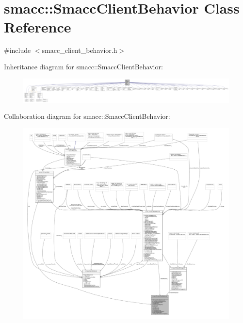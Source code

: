 \hypertarget{classsmacc_1_1SmaccClientBehavior}{}\section{smacc\+:\+:Smacc\+Client\+Behavior Class Reference}
\label{classsmacc_1_1SmaccClientBehavior}


{\ttfamily \#include $<$smacc\+\_\+client\+\_\+behavior.\+h$>$}



Inheritance diagram for smacc\+:\+:Smacc\+Client\+Behavior\+:
\nopagebreak
\begin{figure}[H]
\begin{center}
\leavevmode
\includegraphics[width=350pt]{classsmacc_1_1SmaccClientBehavior__inherit__graph}
\end{center}
\end{figure}


Collaboration diagram for smacc\+:\+:Smacc\+Client\+Behavior\+:
\nopagebreak
\begin{figure}[H]
\begin{center}
\leavevmode
\includegraphics[width=350pt]{classsmacc_1_1SmaccClientBehavior__coll__graph}
\end{center}
\end{figure}
